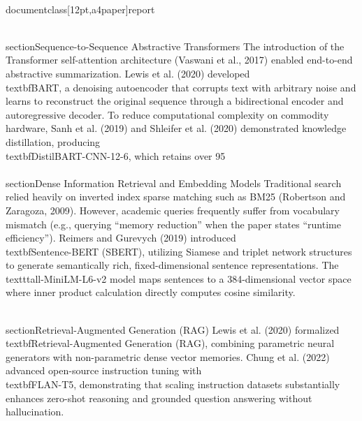 \\documentclass[12pt,a4paper]{report}
\begin{document}
\\section{Sequence-to-Sequence Abstractive Transformers}
The introduction of the Transformer self-attention architecture (Vaswani et al., 2017) enabled end-to-end abstractive summarization. Lewis et al. (2020) developed \\textbf{BART}, a denoising autoencoder that corrupts text with arbitrary noise and learns to reconstruct the original sequence through a bidirectional encoder and autoregressive decoder. To reduce computational complexity on commodity hardware, Sanh et al. (2019) and Shleifer et al. (2020) demonstrated knowledge distillation, producing \\textbf{DistilBART-CNN-12-6}, which retains over 95\\%

\\section{Dense Information Retrieval and Embedding Models}
Traditional search relied heavily on inverted index sparse matching such as BM25 (Robertson and Zaragoza, 2009). However, academic queries frequently suffer from vocabulary mismatch (e.g., querying ``memory reduction'' when the paper states ``runtime efficiency''). Reimers and Gurevych (2019) introduced \\textbf{Sentence-BERT (SBERT)}, utilizing Siamese and triplet network structures to generate semantically rich, fixed-dimensional sentence representations. The \\texttt{all-MiniLM-L6-v2} model maps sentences to a 384-dimensional vector space where inner product calculation directly computes cosine similarity.

\\section{Retrieval-Augmented Generation (RAG)}
Lewis et al. (2020) formalized \\textbf{Retrieval-Augmented Generation (RAG)}, combining parametric neural generators with non-parametric dense vector memories. Chung et al. (2022) advanced open-source instruction tuning with \\textbf{FLAN-T5}, demonstrating that scaling instruction datasets substantially enhances zero-shot reasoning and grounded question answering without hallucination.
\end{document}
